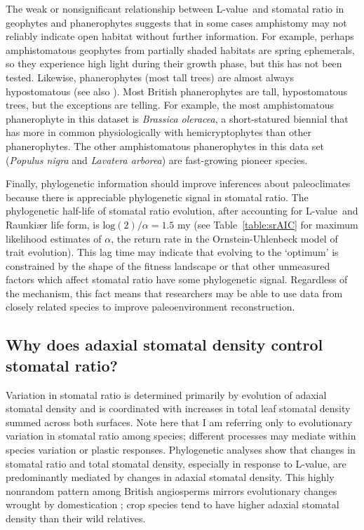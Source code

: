 \documentclass[12pt, oneside]{article}
\newcommand{\el}{L-value}
\begin{document}
The weak or nonsignificant relationship between \el~and stomatal ratio in geophytes and phanerophytes suggests that in some cases amphistomy may not reliably indicate open habitat without further information. For example, perhaps amphistomatous geophytes from partially shaded habitats are spring ephemerals, so they  experience high light during their growth phase, but this has not been tested. Likewise, phanerophytes (most tall trees) are almost always hypostomatous (see also \cite{Muir_2015}). Most British phanerophytes are tall, hypostomatous trees, but the exceptions are telling. For example, the most amphistomatous phanerophyte in this dataset is \textit{Brassica oleracea}, a short-statured biennial that has more in common physiologically with hemicryptophytes than other phanerophytes. The other amphistomatous phanerophytes in this data set (\textit{Populus nigra} and \textit{Lavatera arborea}) are fast-growing pioneer species.

Finally, phylogenetic information should improve inferences about paleoclimates because there is appreciable phylogenetic signal in stomatal ratio. The phylogenetic half-life of stomatal ratio evolution, after accounting for \el~and Raunki\ae r life form, is $\mathrm{log}(2) / \alpha = 1.5$ my (see Table~\ref{table:srAIC} for maximum likelihood estimates of $\alpha$, the return rate in the Ornstein-Uhlenbeck model of trait evolution). This lag time may indicate that evolving to the `optimum' is constrained by the shape of the fitness landscape \citep{Muir_2015} or that other unmeasured factors which affect stomatal ratio have some phylogenetic signal. Regardless of the mechanism, this fact means that researchers may be able to use data from closely related species to improve paleoenvironment reconstruction.

\subsection*{Why does adaxial stomatal density control stomatal ratio?}

Variation in stomatal ratio is determined primarily by evolution of adaxial stomatal density and is coordinated with increases in total leaf stomatal density summed across both surfaces. Note here that I am referring only to evolutionary variation in stomatal ratio among species; different processes may mediate within species variation or plastic responses. Phylogenetic analyses show that changes in stomatal ratio and total stomatal density, especially in response to \el, are predominantly mediated by changes in adaxial stomatal density. This highly nonrandom pattern among British angiosperms mirrors evolutionary changes wrought by domestication \citep{Milla_etal_2013}; crop species tend to have higher adaxial stomatal density than their wild relatives. 
\end{document}
